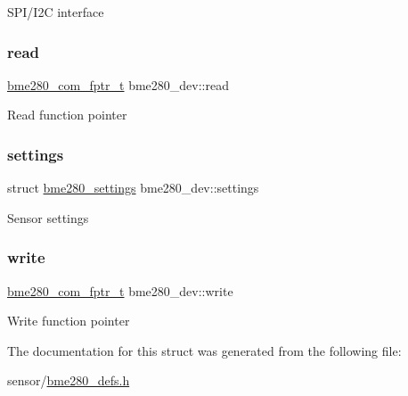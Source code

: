 S\+P\+I/\+I2C interface \mbox{\label{structbme280__dev_a9a0ad5b467e2acc04a854878fe71bf7f}} 
\subsubsection{\texorpdfstring{read}{read}}
{\footnotesize\ttfamily \hyperlink{group___b_m_e280_ga7c23fe68ccf92adb3f03882b40739e7b}{bme280\+\_\+com\+\_\+fptr\+\_\+t} bme280\+\_\+dev\+::read}

Read function pointer \mbox{\label{structbme280__dev_acd3efe8b8ac1e08f9cb21e8abec27042}} 
\subsubsection{\texorpdfstring{settings}{settings}}
{\footnotesize\ttfamily struct \hyperlink{structbme280__settings}{bme280\+\_\+settings} bme280\+\_\+dev\+::settings}

Sensor settings \mbox{\label{structbme280__dev_a7d2437824573644b51b8514ca0ec294c}} 
\subsubsection{\texorpdfstring{write}{write}}
{\footnotesize\ttfamily \hyperlink{group___b_m_e280_ga7c23fe68ccf92adb3f03882b40739e7b}{bme280\+\_\+com\+\_\+fptr\+\_\+t} bme280\+\_\+dev\+::write}

Write function pointer 

The documentation for this struct was generated from the following file\+:\begin{DoxyCompactItemize}
\item 
sensor/\hyperlink{bme280__defs_8h}{bme280\+\_\+defs.\+h}\end{DoxyCompactItemize}
